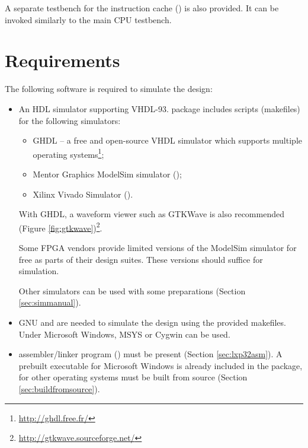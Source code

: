 \documentclass[a4paper,12pt,twoside,extrafontsizes]{memoir}
\begin{document}
A separate testbench for the instruction cache () is also provided. It can be invoked similarly to the main CPU testbench.

\section{Requirements}

The following software is required to simulate the \lxp{} design:

\begin{itemize}
	\item An HDL simulator supporting VHDL-93. \lxp{} package includes scripts (makefiles) for the following simulators:
	
	\begin{itemize}
		\item GHDL -- a free and open-source VHDL simulator which supports multiple operating systems\footnote{\url{http://ghdl.free.fr/}};
		\item Mentor Graphics\textregistered{} ModelSim\textregistered{} simulator ();
		\item Xilinx\textregistered{} Vivado\textregistered{} Simulator ().
	\end{itemize}
	
	With GHDL, a waveform viewer such as GTKWave is also recommended (Figure \ref{fig:gtkwave})\footnote{\url{http://gtkwave.sourceforge.net/}}.
	
	Some FPGA vendors provide limited versions of the ModelSim\textregistered{} simulator for free as parts of their design suites. These versions should suffice for \lxp{} simulation.
	
	Other simulators can be used with some preparations (Section \ref{sec:simmanual}).
	
	\item GNU  and  are needed to simulate the design using the provided makefiles. Under Microsoft\textregistered{} Windows\textregistered{}, MSYS or Cygwin can be used.
	\item \lxp{} assembler/linker program () must be present (Section \ref{sec:lxp32asm}). A prebuilt executable for Microsoft\textregistered{} Windows\textregistered{} is already included in the \lxp{} package, for other operating systems  must be built from source (Section \ref{sec:buildfromsource}).
\end{itemize}
\end{document}
